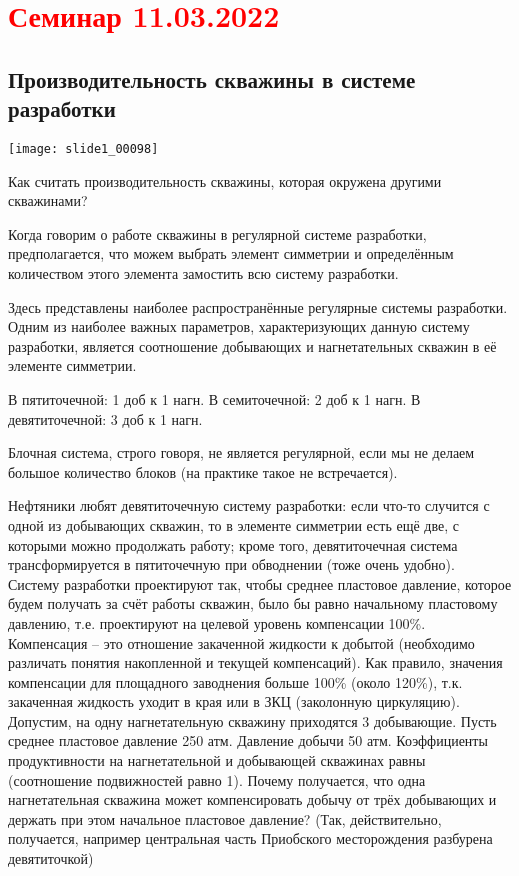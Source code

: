 \documentclass[main.tex]{subfiles}
\begin{document}
\section{\textcolor{red}{Семинар 11.03.2022}}

\subsection{Производительность скважины в системе разработки}

\texttt{[image: slide1\_00098]}

Как считать производительность скважины, которая окружена другими скважинами?

Когда говорим о работе скважины в регулярной системе разработки, предполагается, что можем выбрать элемент симметрии и определённым количеством этого элемента замостить всю систему разработки.

Здесь представлены наиболее распространённые регулярные системы разработки. Одним из наиболее важных параметров, характеризующих данную систему разработки, является соотношение добывающих и нагнетательных скважин в её элементе симметрии.

В пятиточечной: 1 доб к 1 нагн. В семиточечной: 2 доб к 1 нагн. В девятиточечной: 3 доб к 1 нагн.

Блочная система, строго говоря, не является регулярной, если мы не делаем большое количество блоков (на практике такое не встречается).

Нефтяники любят девятиточечную систему разработки: если что-то случится с одной из добывающих скважин, то в элементе симметрии есть ещё две, с которыми можно продолжать работу; кроме того, девятиточечная система трансформируется в пятиточечную при обводнении (тоже очень удобно).\\

Систему разработки проектируют так, чтобы среднее пластовое давление, которое будем получать за счёт работы скважин, было бы равно начальному пластовому давлению, т.е. проектируют на целевой уровень компенсации 100\%.\\

Компенсация -- это отношение закаченной жидкости к добытой (необходимо различать понятия накопленной и текущей компенсаций). Как правило, значения компенсации для площадного заводнения больше 100\% (около 120\%), т.к. закаченная жидкость уходит в края или в ЗКЦ (заколонную циркуляцию).\\

Допустим, на одну нагнетательную скважину приходятся 3 добывающие. Пусть среднее пластовое давление 250 атм. Давление добычи 50 атм. Коэффициенты продуктивности на нагнетательной и добывающей скважинах равны (соотношение подвижностей равно 1). Почему получается, что одна нагнетательная скважина может компенсировать добычу от трёх добывающих и держать при этом начальное пластовое давление? (Так, действительно, получается, например центральная часть Приобского месторождения разбурена девятиточкой)\\
\end{document}
